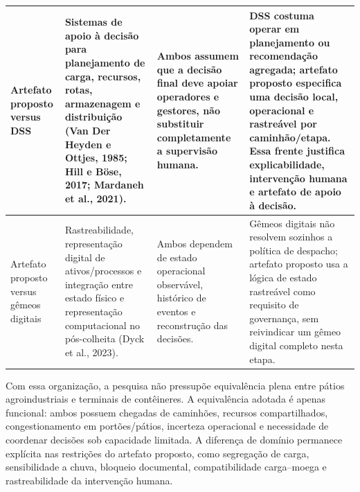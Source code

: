 \documentclass[
  12pt,
  oneside,
  a4paper,
  sumario=tradicional,
  brazil
]{abntex2}
\begin{document}
{\begin{longtable}{|P{0.18\textwidth}|P{0.22\textwidth}|P{0.24\textwidth}|P{0.25\textwidth}|}
\hline
Artefato proposto versus DSS & Sistemas de apoio \`a decis\~ao para planejamento de carga, recursos, rotas, armazenagem e distribui\c{c}\~ao (Van Der Heyden e Ottjes, 1985; Hill e B\"ose, 2017; Mardaneh et al., 2021). & Ambos assumem que a decis\~ao final deve apoiar operadores e gestores, n\~ao substituir completamente a supervis\~ao humana. & DSS costuma operar em planejamento ou recomenda\c{c}\~ao agregada; artefato proposto especifica uma decis\~ao local, operacional e rastre\'avel por caminh\~ao/etapa. Essa frente justifica explicabilidade, interven\c{c}\~ao humana e artefato de apoio \`a decis\~ao. \\
\hline
Artefato proposto versus g\^emeos digitais & Rastreabilidade, representa\c{c}\~ao digital de ativos/processos e integra\c{c}\~ao entre estado f\'isico e representa\c{c}\~ao computacional no p\'os-colheita (Dyck et al., 2023). & Ambos dependem de estado operacional observ\'avel, hist\'orico de eventos e reconstru\c{c}\~ao das decis\~oes. & G\^emeos digitais n\~ao resolvem sozinhos a pol\'itica de despacho; artefato proposto usa a l\'ogica de estado rastre\'avel como requisito de governan\c{c}a, sem reivindicar um g\^emeo digital completo nesta etapa. \\
\hline
\end{longtable}
}

Com essa organiza\c{c}\~ao, a pesquisa n\~ao pressup\~oe equival\^encia plena entre p\'atios agroindustriais e terminais de cont\^eineres. A equival\^encia adotada \'e apenas funcional: ambos possuem chegadas de caminh\~oes, recursos compartilhados, congestionamento em port\~oes/p\'atios, incerteza operacional e necessidade de coordenar decis\~oes sob capacidade limitada. A diferen\c{c}a de dom\'inio permanece expl\'icita nas restri\c{c}\~oes do artefato proposto, como segrega\c{c}\~ao de carga, sensibilidade a chuva, bloqueio documental, compatibilidade carga--moega e rastreabilidade da interven\c{c}\~ao humana.
\end{document}

